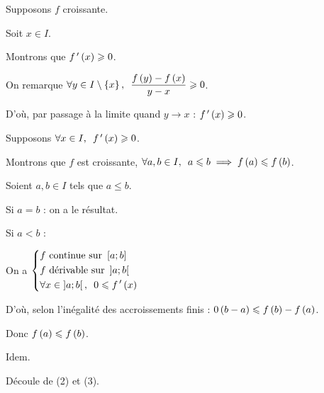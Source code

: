 \begin{dem}[2]
\impdir

Supposons \(f\) croissante.

Soit \(x\in I\).

Montrons que \(f^{\,\prime}\left(x\right)\geqslant0\).

On remarque \(\quantifs{\forall y\in I\excluant\accol{x}}\dfrac{f\paren{y}-f\paren{x}}{y-x}\geq0\).

D'où, par passage à la limite quand \(y\to x\) : \(f^{\,\prime}\left(x\right)\geqslant0\).

\imprec

Supposons \(\quantifs{\forall x\in I}f\prim\paren{x}\geq0\).

Montrons que \(f\) est croissante, \cad \(\quantifs{\forall a,b\in I}a\leq b\imp f\paren{a}\leq f\paren{b}\).

Soient \(a,b\in I\) tels que \(a\leq b\).

Si \(a=b\) : on a le résultat.

Si \(a<b\) :

On a \(\begin{dcases}f\text{ continue sur }\intervii{a}{b} \\ f\text{ dérivable sur }\intervee{a}{b} \\ \quantifs{\forall x\in\intervee{a}{b}}0\leq f\prim\paren{x}\end{dcases}\)

D'où, selon l'inégalité des accroissements finis : \(0\left(b-a\right)\leqslant f\left(b\right)-f\left(a\right)\).

Donc \(f\left(a\right)\leqslant f\left(b\right)\).
\end{dem}

\begin{dem}[3]
Idem.
\end{dem}

\begin{dem}[1]
Découle de (2) et (3).
\end{dem}


